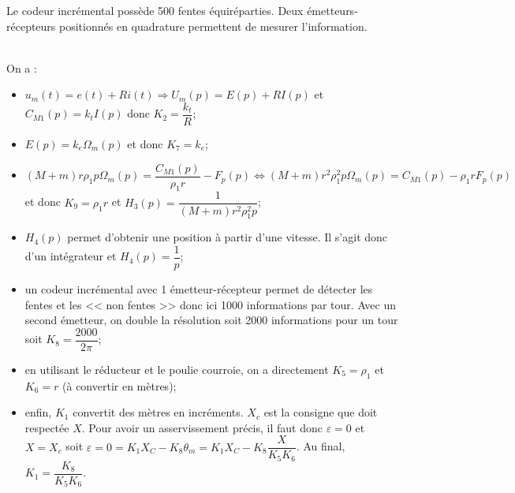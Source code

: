 Le codeur incrémental possède 500 fentes équiréparties. Deux émetteurs-récepteurs positionnés en quadrature permettent de mesurer l'information. 
\fi

\ifprof
\begin{corrige}~\\
On a :
\begin{itemize}
\item $ u_m(t)=e(t)+Ri(t) \Rightarrow  U_m(p)=E(p)+RI(p) $ et $C_{M1}(p)=k_t I(p)$ donc $K_2 = \dfrac{k_t}{R}$;
\item $E(p)=k_e\Omega_m(p)$ et donc $K_7 = k_e$;
\item $\left(M+m\right)r\rho_1 p\Omega_m(p)=\dfrac{C_{M1}(p)}{\rho_1 r}-F_p(p) \Leftrightarrow\left(M+m\right)r^2\rho_1^2 p\Omega_m(p)=C_{M1}(p)-\rho_1 rF_p(p) $ et donc $K_9 = \rho_1 r$ et $H_3(p)=\dfrac{1}{\left(M+m\right)r^2\rho_1^2 p}$;
\item  $H_4(p)$ permet d'obtenir une position à partir d'une vitesse. Il s'agit donc d'un intégrateur et $H_4(p)=\dfrac{1}{p}$; 
\item un codeur incrémental avec 1 émetteur-récepteur permet de détecter les fentes et les << non fentes >> donc ici 1000 informations par tour. Avec un second émetteur, on double la résolution soit 2000 informations pour un tour soit $K_8  = \dfrac{2000}{2\pi}$;
\item en utilisant le réducteur et le poulie courroie, on a directement $K_5=\rho_1$ et $K_6=r$ (à convertir en mètres);
\item enfin, $K_1$ convertit des mètres en incréments. $X_c$ est la consigne que doit respectée $X$. Pour avoir un asservissement précis, il faut donc $\varepsilon = 0$ et $X=X_c$ soit $\varepsilon = 0 = K_1 X_C - K_8 \theta_m = K_1 X_C - K_8 \dfrac{X}{K_5 K_6}$. Au final, $K_1 =\dfrac{K_8}{K_5 K_6}$.
\end{itemize}
\end{corrige}
\else
\fi

\ifcolle
\else


